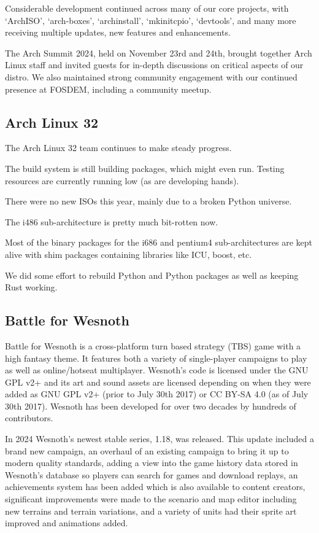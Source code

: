 \documentclass[a4paper]{report}
\begin{document}
Considerable development continued across many of our core projects, with `ArchISO', `arch-boxes', `archinstall', `mkinitcpio', `devtools', and many more receiving multiple updates, new features and enhancements.

The Arch Summit 2024, held on November 23rd and 24th, brought together Arch Linux staff and invited guests for in-depth discussions on critical aspects of our distro. We also maintained strong community engagement with our continued presence at FOSDEM, including a community meetup.

\subsection{Arch Linux 32}

The Arch Linux 32 team continues to make steady progress.

The build system is still building packages, which might even run. Testing resources are currently running low (as are developing hands).

There were no new ISOs this year, mainly due to a broken Python universe.

The i486 sub-architecture is pretty much bit-rotten now.

Most of the binary packages for the i686 and  pentium4 sub-architectures are kept alive with shim packages containing libraries like ICU, boost, etc.

We did some effort to rebuild Python and Python packages as well as keeping Rust working.

\subsection{Battle for Wesnoth}

Battle for Wesnoth is a cross-platform turn based strategy (TBS) game with a high fantasy theme. It features both a variety of single-player campaigns to play as well as online/hotseat multiplayer. Wesnoth's code is licensed under the GNU GPL v2+ and its art and sound assets are licensed depending on when they were added as GNU GPL v2+ (prior to July 30th 2017) or CC BY-SA 4.0 (as of July 30th 2017). Wesnoth has been developed for over two decades by hundreds of contributors.

In 2024 Wesnoth's newest stable series, 1.18, was released. This update included a brand new campaign, an overhaul of an existing campaign to bring it up to modern quality standards, adding a view into the game history data stored in Wesnoth's database so players can search for games and download replays, an achievements system has been added which is also available to content creators, significant improvements were made to the scenario and map editor including new terrains and terrain variations, and a variety of units had their sprite art improved and animations added.
\end{document}
